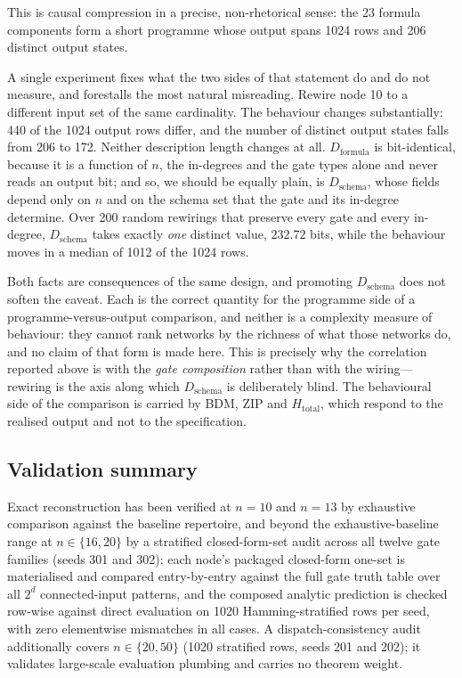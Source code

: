 \documentclass[11pt]{article}
\begin{document}
\medskip
This is causal compression in a precise, non-rhetorical sense: the 23 formula
components form a short programme whose output spans 1024 rows and 206
distinct output states.

A single experiment fixes what the two sides of that statement do and do not
measure, and forestalls the most natural misreading.  Rewire node 10 to a
different input set of the same cardinality.  The behaviour changes
substantially: 440 of the 1024 output rows differ, and the number of distinct
output states falls from 206 to 172.  Neither description length changes at
all.  $D_{\mathrm{formula}}$ is bit-identical, because it is a function of $n$,
the in-degrees and the gate types alone and never reads an output bit; and so,
we should be equally plain, is $D_{\mathrm{schema}}$, whose fields depend only
on $n$ and on the schema set that the gate and its in-degree determine.  Over
200 random rewirings that preserve every gate and every in-degree,
$D_{\mathrm{schema}}$ takes exactly \emph{one} distinct value, $232.72$ bits,
while the behaviour moves in a median of 1012 of the 1024 rows.

Both facts are consequences of the same design, and promoting
$D_{\mathrm{schema}}$ does not soften the caveat.  Each is the correct quantity
for the programme side of a programme-versus-output comparison, and neither is
a complexity measure of behaviour: they cannot rank networks by the richness of
what those networks do, and no claim of that form is made here.  This is
precisely why the correlation reported above is with the \emph{gate
composition} rather than with the wiring---rewiring is the axis along which
$D_{\mathrm{schema}}$ is deliberately blind.  The behavioural side of the
comparison is carried by BDM, ZIP and $H_{\mathrm{total}}$, which respond to
the realised output and not to the specification.


\subsection{Validation summary}\label{sec:validation}

Exact reconstruction has been verified at $n=10$ and $n=13$ by exhaustive
comparison against the baseline repertoire, and beyond the exhaustive-baseline
range at $n\in\{16,20\}$ by a stratified closed-form-set audit across all twelve
gate families (seeds 301 and 302): each node's packaged closed-form one-set is
materialised and compared entry-by-entry against the full gate truth table over
all $2^{d}$ connected-input patterns, and the composed analytic prediction is
checked row-wise against direct evaluation on 1020 Hamming-stratified rows per
seed, with zero elementwise mismatches in all cases. A dispatch-consistency
audit additionally covers $n\in\{20,50\}$ (1020 stratified rows, seeds 201 and
202); it validates large-scale evaluation plumbing and carries no theorem weight.
\end{document}
